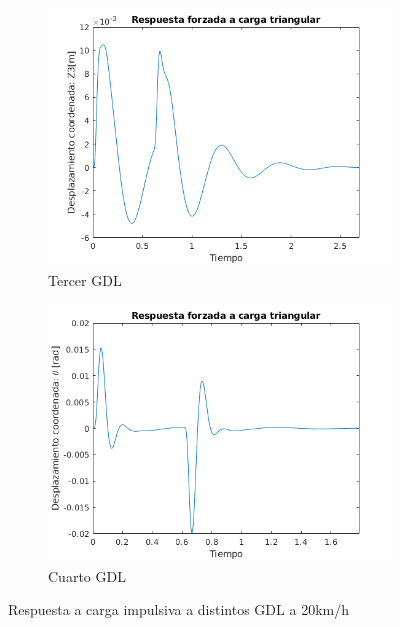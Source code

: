 \documentclass[oneside, a4paper, spanish, links]{amca}
\begin{document}
\begin{figure}[h]
\begin{subfigure}[b]{0.475\textwidth}
        \centering 
        \includegraphics[width=\textwidth]{difcent,picos,Z320kmh.png}
        \caption[]%
        {{\small Tercer GDL}}    
    \end{subfigure}
    \quad
    \begin{subfigure}[b]{0.475\textwidth}   
        \centering 
        \includegraphics[width=\textwidth]{difcent,picos,theta20kmh.png}
        \caption[]%
        {{\small Cuarto GDL}}    
    \end{subfigure}
    \caption[  ]
    {\small Respuesta a carga impulsiva a distintos GDL a 20km/h} 
    \label{fig: resp 4gdl impulso dist velocidades}
\end{figure}
\Floatbarrier
\end{document}
